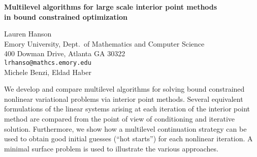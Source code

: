 \documentclass{report}
\begin{document}

\begin{center}
{\large
{\bf Multilevel algorithms for large scale interior point methods \\
	in bound constrained optimization}}

	Lauren Hanson \\
	Emory University, Dept.~of Mathematics and Computer Science \\
	400 Dowman Drive, Atlanta GA 30322 \\
	{\tt lrhanso@mathcs.emory.edu} \\
	Michele Benzi, Eldad Haber
\end{center}
We develop and compare multilevel algorithms for solving
bound constrained nonlinear variational problems via
interior point methods. Several equivalent formulations of
the linear systems arising at each iteration of the interior
point method are compared from the point of view of
conditioning and iterative solution. Furthermore, we show
how a multilevel continuation strategy can be used to obtain
good initial guesses (``hot starts'') for each
nonlinear iteration. A minimal surface problem is used to
illustrate the various approaches.


\end{document}
